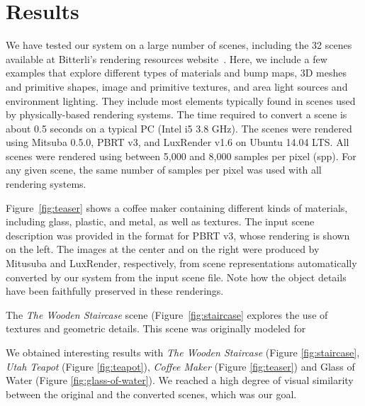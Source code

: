 \section{Results}
\label{sec:results}

We have tested our system on a large number of scenes, including the 32 scenes available
at Bitterli's rendering resources website~\cite{resources16}. 
Here, we include a few examples that explore different 
types of materials and bump maps, 3D meshes and primitive shapes, image and 
primitive textures, and area light sources and environment lighting. They include most elements typically found in scenes used by physically-based rendering systems.  The time required to convert a scene is about 0.5 seconds on a typical PC (Intel i5 3.8 GHz).
% 
%
The scenes were rendered using Mitsuba 0.5.0, PBRT v3, and LuxRender v1.6 on 
Ubuntu 14.04 LTS. All scenes were rendered using between 5,000 and 8,000 samples per pixel (spp). For any given scene,
the same number of samples per pixel was used with all rendering systems. 

Figure~\ref{fig:teaser} shows a coffee maker containing different kinds of materials, including glass, plastic, and metal, as well as textures. The input scene description was provided in the format for PBRT v3, whose rendering is shown on the left. The images at the center and on the right were produced by Mitusuba and LuxRender, respectively, from scene representations automatically converted by our system from the input scene file. Note how the object details have been faithfully preserved in these renderings.

The \textit{The Wooden Staircase} scene (Figure~\ref{fig:staircase} explores the use of textures and geometric details. This scene was originally modeled for 

We obtained interesting results with \textit{The Wooden Staircase} (Figure 
\ref{fig:staircase}, \textit{Utah Teapot} (Figure \ref{fig:teapot}), 
\textit{Coffee Maker} (Figure \ref{fig:teaser}) and Glass of Water (Figure 
\ref{fig:glass-of-water}). We reached a high degree of visual similarity between 
the original and the converted scenes, which was our goal.

